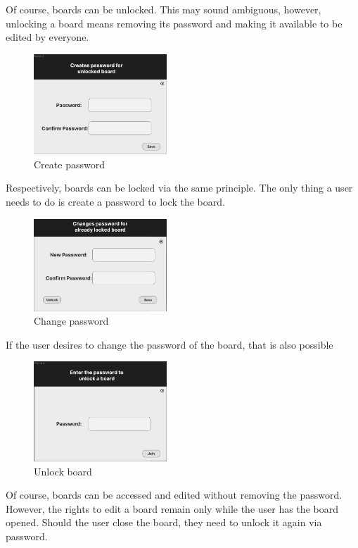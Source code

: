 Of course, boards can be unlocked. This may sound ambiguous, however, unlocking a board means removing its password and making it available to be edited by everyone.

\begin{figure}[H]
\includegraphics[width=5cm]{content/mockups/password_frame_2.png} 
\caption{Create password}
\end{figure}

Respectively, boards can be locked via the same principle. The only thing a user needs to do is create a password to lock the board.

\begin{figure}[H]
\includegraphics[width=5cm]{content/mockups/password_frame_3.png} 
\caption{Change password}
\end{figure}

If the user desires to change the password of the board, that is also possible

\begin{figure}[H]
\includegraphics[width=5cm]{content/mockups/password_frame_4.png} 
\caption{Unlock board}
\end{figure}

Of course, boards can be accessed and edited without removing the password. However, the rights to edit a board remain only while the user has the board opened. Should the user close the board, they need to unlock it again via password.

